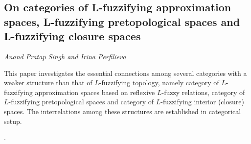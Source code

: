 \documentclass[../booklet.tex]{subfiles}
\begin{document}
\subsection[On categories of L-fuzzifying approximation spaces, L-fuzzifying pretopological spaces and L-fuzzifying closure spaces. {\it Anand Pratap Singh and Irina Perfilieva}]{On categories of L-fuzzifying approximation spaces, L-fuzzifying pretopological spaces and L-fuzzifying closure spaces}
 

\begin{center}
  {\it Anand Pratap Singh and Irina Perfilieva}
\end{center}

\vskip 0.8cm


This paper investigates the essential connections among several categories with a weaker structure than that of $L$-fuzzifying topology, namely category of $L$-fuzzifying approximation spaces based on reflexive $L$-fuzzy relations, category of $L$-fuzzifying pretopological spaces and category of $L$-fuzzifying interior (closure) spaces. The interrelations among these structures are established in categorical setup.

.
\end{document}
